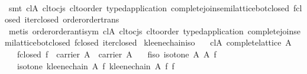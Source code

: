 \begin{isabellebody}
\ \ \isamarkupfalse%
\ {}smt\ cl{}A\ cl{}to{}cjs\ cl{}to{}order\ typed{}application\ complete{}join{}semilattice{}bot{}closed\ f{}closed\ iter{}closed\ order{}order{}trans{}\isanewline
\ \ \isamarkupfalse%
\ {}metis\ order{}order{}antisym\ cl{}A\ cl{}to{}cjs\ cl{}to{}order\ typed{}application\ complete{}join{}semilattice{}bot{}closed\ f{}closed\ iter{}closed{}%
\endisatagproof
{\isafoldproof}%
%
\isadelimproof
\isanewline
%
\endisadelimproof
\isanewline
{}\isamarkupfalse%
\ kleene{}chain{}iso{}\isanewline
\ \ \ cl{}A{}\ {}complete{}lattice\ A{}\isanewline
\ \ \ f{}closed{}\ {}f\ {}\ carrier\ A\ {}\ carrier\ A{}\isanewline
\ \ \ f{}iso{}\ {}isotone\ A\ A\ f{}\isanewline
\ \ \ {}isotone\ {}kleene{}chain\ A\ f{}\ {}kleene{}chain\ A\ f{}\ f{}\isanewline

\end{isabellebody}

